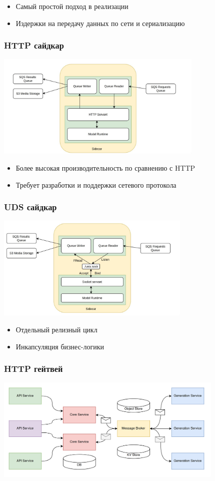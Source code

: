 \documentclass{beamer}
\begin{document}
\begin{frame}
	\begin{itemize}
		\item Самый простой подход в реализации
		\item Издержки на передачу данных по сети и сериализацию
	\end{itemize}
	\frametitle{HTTP сайдкар}
	\centering
	\includegraphics[height=5cm]{img/side2.jpg}
\end{frame}

\begin{frame}
	\begin{itemize}
		\item Более высокая производительность по сравнению с HTTP
		\item Требует разработки и поддержки сетевого протокола
	\end{itemize}
	\frametitle{UDS сайдкар}
	\centering
	\includegraphics[height=5cm]{img/side3.jpg}
\end{frame}

\begin{frame}
	\begin{itemize}
		\item Отдельный релизный цикл
		\item Инкапсуляция бизнес-логики
	\end{itemize}
	\frametitle{HTTP гейтвей}
	\centering
	\includegraphics[height=5cm]{img/final.png}
\end{frame}
\end{document}
